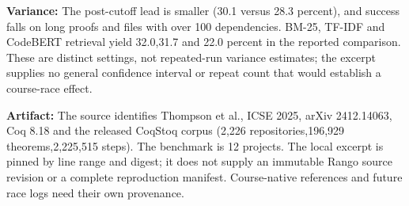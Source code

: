 \documentclass[11pt]{article}
\begin{document}
\begin{answer}
\textbf{Variance:} The post-cutoff lead is smaller (30.1 versus 28.3 percent), and success falls on long proofs and files with over 100 dependencies. BM-25, TF-IDF and CodeBERT retrieval yield 32.0,31.7 and 22.0 percent in the reported comparison. These are distinct settings, not repeated-run variance estimates; the excerpt supplies no general confidence interval or repeat count that would establish a course-race effect.

\textbf{Artifact:} The source identifies Thompson et al., ICSE 2025, arXiv 2412.14063, Coq 8.18 and the released CoqStoq corpus (2,226 repositories,196,929 theorems,2,225,515 steps). The benchmark is 12 projects. The local excerpt is pinned by line range and digest; it does not supply an immutable Rango source revision or a complete reproduction manifest. Course-native references and future race logs need their own provenance.
\end{answer}
\end{document}

